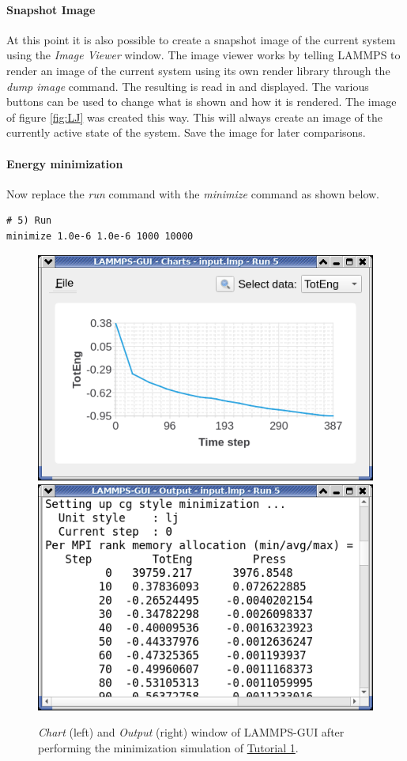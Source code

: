 \documentclass[9pt,tutorial]{livecoms}
\begin{document}
\paragraph{Snapshot Image}

At this point it is also possible to create a snapshot image of the
current system using the \textit{Image Viewer} window.  The image viewer
works by telling LAMMPS to render an image of the current system using
its own render library through the \textit{dump image} command.  The
resulting is read in and displayed.  The various buttons can be used to
change what is shown and how it is rendered.  The image of figure
\ref{fig:LJ} was created this way.  This will always create an image of
the currently active state of the system.  Save the image for later
comparisons.

\paragraph{Energy minimization}
Now replace the \textit{run} command with the \textit{minimize} command
as shown below.
{\normalsize
\begin{verbatim}
# 5) Run
minimize 1.0e-6 1.0e-6 1000 10000
\end{verbatim}
}

\begin{figure}
\centering
\includegraphics[width=0.45\linewidth]{chart-1}
\includegraphics[width=0.45\linewidth]{output-1}
\caption{\textit{Chart} (left) and \textit{Output} (right) window of LAMMPS-GUI after performing
  the minimization simulation of \hyperref[lennard-jones-label]{Tutorial 1}.}
\label{fig:chart-log}
\end{figure}
\end{document}
